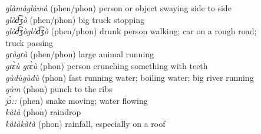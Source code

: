 \documentclass[output=paper,colorlinks,citecolor=brown]{langscibook}
\begin{document}
\begin{tabbing}
\textit{glàmàglàmà}                       \>(phen/phon) person or object swaying side to side                                                       \\
\textit{glòd͡ʒò}                            \>(phen/phon) big truck stopping                                                                          \\
\textit{glòd͡ʒòglòd͡ʒò}                   \>(phen/phon) drunk person walking; car on a rough road; \\
\> truck passing                               \\
\textit{gɾàgɾà}                             \>(phen/phon) large animal running                                   \\
\textit{gɾɛ̀ù gɾɛ̀ù}                        \>(phon) person crunching something with teeth                                                            \\
\textit{gùdùgùdù}                         \>(phon) fast running water; boiling water; big river running       \\
\textit{gùm}    \>(phon) punch to the ribs                                                                                    \\
\textit{jɔ̀::}                                \>(phen) snake moving; water flowing                                                                      \\
\textit{kàtà}                               \>(phon) raindrop                                                                                         \\
\textit{kàtàkàtà}                         \>(phon) rainfall, especially on a roof                                                                    \\
  

\end{tabbing}
\end{document}
